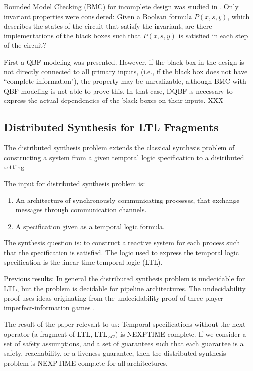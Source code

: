 \documentclass[runningheads]{llncs}
\begin{document}
Bounded Model Checking (BMC) for incomplete design was studied in \cite{millerklb10, millersb13}. Only invariant
properties were considered: Given a Boolean formula $P(x, s, y)$, which describes the states of the circuit that satisfy the invariant, are there implementations of the black boxes such that $P(x, s, y)$ is satisfied in each step of the circuit?

First a QBF modeling was presented. However, if the black box in the design is not directly connected to all primary inputs, (i.e., if the black box does not have ``complete information"), the property may be unrealizable, although BMC with QBF modeling is not able to prove this.
In that case, DQBF is necessary to express the actual dependencies of the black boxes on their inputs.
XXX

\subsection{Distributed Synthesis for LTL Fragments \cite{chatterjee13}}


The distributed synthesis problem \cite{pnueli90} extends
the classical synthesis problem of constructing a system from a given temporal logic specification to a distributed setting.

The input for distributed synthesis problem is:
\begin{enumerate}
  \item An architecture of synchronously communicating processes, that exchange messages through communication channels.
  \item A specification given as a temporal logic formula.
\end{enumerate}

The synthesis question is: to construct a reactive system for each process such that the specification is satisfied.
The logic used to express the temporal logic specification is the linear-time temporal logic (LTL).

Previous results:
In general the distributed synthesis problem is undecidable for LTL, but the problem is decidable for pipeline architectures.
The undecidability proof uses ideas originating from the undecidability proof of three-player imperfect-information games \cite{peterson2001lower}.

The result of the paper relevant to us: Temporal specifications without the next operator (a fragment of LTL, LTL$_{AG}$) is NEXPTIME-complete.
If we consider a set of safety assumptions, and a set of guarantees such that each guarantee is a safety, reachability, or a liveness guarantee, then the distributed synthesis problem is NEXPTIME-complete for all architectures.
\end{document}
